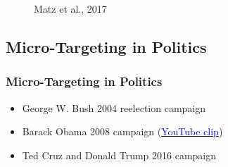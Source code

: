 \documentclass[aspectratio=169]{beamer}
\begin{document}
\begin{frame}
{\begin{figure}
            \caption{Matz et al., 2017}
        \end{figure}
    }

\end{frame}

\subsection[Politics]{Micro-Targeting in Politics}

\begin{frame}
    \frametitle{Micro-Targeting in Politics}
    \begin{itemize}
        \item George W. Bush 2004 reelection campaign
        \item Barack Obama 2008 campaign (\href{https://www.youtube.com/watch?time_continue=7&v=BiQwcFRUg_8}{\textcolor{blue}{YouTube clip}})
        \item Ted Cruz and Donald Trump 2016 campaign
    \end{itemize}
\end{frame}
\end{document}
